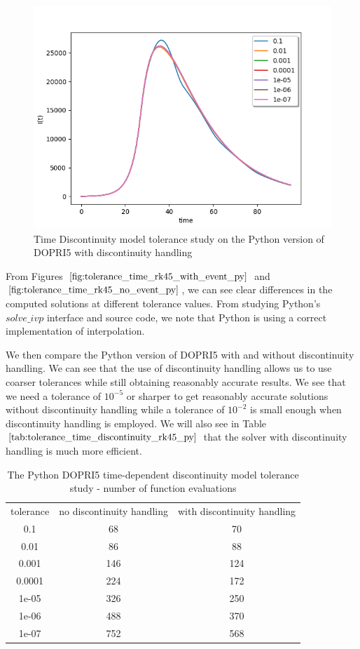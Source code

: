 \begin{figure}[H]
\centering
\includegraphics[width=0.7\linewidth]{./figures/tolerance_time_rk45_with_event_py}
\caption{Time Discontinuity model tolerance study on the Python version of DOPRI5 with discontinuity handling}
\label{fig:tolerance_time_rk45_with_event_py}
\end{figure}

From Figures $\ref{fig:tolerance_time_rk45_with_event_py}$ and $\ref{fig:tolerance_time_rk45_no_event_py}$, we can see clear differences in the computed solutions at different tolerance values. From studying Python's $solve\_ivp$ interface and source code, we note that Python is using a correct implementation of interpolation.

We then compare the Python version of DOPRI5 with and without discontinuity handling. We can see that the use of discontinuity handling allows us to use coarser tolerances while still obtaining reasonably accurate results. We see that we need a tolerance of $10^{-5}$ or sharper to get reasonably accurate solutions without discontinuity handling while a tolerance of $10^{-2}$ is small enough when discontinuity handling is employed. We will also see in Table $\ref{tab:tolerance_time_discontinuity_rk45_py}$ that the solver with discontinuity handling is much more efficient.


\begin{table}[H]
\caption {The Python DOPRI5 time-dependent discontinuity model tolerance study - number of function evaluations} \label{tab:tolerance_time_discontinuity_rk45_py} 
\begin{center}
\begin{tabular}{ c c c }
tolerance & no discontinuity handling & with discontinuity handling \\ 
0.1 & 68 & 70 \\
0.01 & 86 & 88 \\
0.001 & 146 & 124 \\
0.0001& 224 & 172 \\
1e-05 & 326 & 250 \\
1e-06 & 488 & 370 \\
1e-07 & 752 & 568 \\
\end{tabular}
\end{center}
\end{table}

